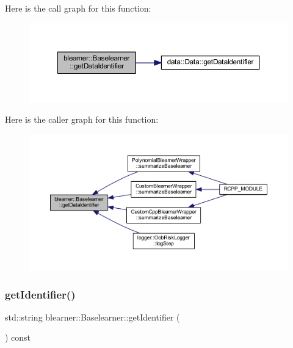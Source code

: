 Here is the call graph for this function\+:\nopagebreak
\begin{figure}[H]
\begin{center}
\leavevmode
\includegraphics[width=350pt]{classblearner_1_1_baselearner_a2393dc1e3cf90919ebbbd237fe303860_cgraph}
\end{center}
\end{figure}
Here is the caller graph for this function\+:\nopagebreak
\begin{figure}[H]
\begin{center}
\leavevmode
\includegraphics[width=350pt]{classblearner_1_1_baselearner_a2393dc1e3cf90919ebbbd237fe303860_icgraph}
\end{center}
\end{figure}
\mbox{\label{classblearner_1_1_baselearner_aa10fa4301aeb37f6e8c18457541c3be7}} 
\subsubsection{\texorpdfstring{get\+Identifier()}{getIdentifier()}}
{\footnotesize\ttfamily std\+::string blearner\+::\+Baselearner\+::get\+Identifier (\begin{DoxyParamCaption}{ }\end{DoxyParamCaption}) const}

